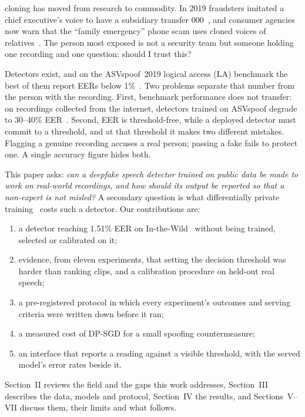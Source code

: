 \documentclass[journal]{IEEEtran}
\begin{document}
 cloning has moved from research to commodity. In 2019
fraudsters imitated a chief executive's voice to have a subsidiary transfer
000~\cite{wsj2019voice}, and consumer agencies now warn that
the ``family emergency'' phone scam uses cloned voices of
relatives~\cite{ftc2023voice}. The person most exposed is not a security
team but someone holding one recording and one question: should I trust
this?

Detectors exist, and on the ASVspoof~2019 logical access (LA) benchmark the
best of them report EERs below 1\%~\cite{jung2022aasist,tak2022ssl}. Two
problems separate that number from the person with the recording. First,
benchmark performance does not transfer: on recordings collected from the
internet, detectors trained on ASVspoof degrade to 30--40\%
EER~\cite{muller2022itw}. Second, EER is threshold-free, while a deployed
detector must commit to a threshold, and at that threshold it makes two
different mistakes. Flagging a genuine recording accuses a real person;
passing a fake fails to protect one. A single accuracy figure hides both.

This paper asks: \emph{can a deepfake speech detector trained on public data
be made to work on real-world recordings, and how should its output be
reported so that a non-expert is not misled?} A secondary question is what
differentially private training~\cite{abadi2016dpsgd} costs such a detector.
Our contributions are:
\begin{enumerate}
\item a detector reaching 1.51\% EER on In-the-Wild~\cite{muller2022itw}
  without being trained, selected or calibrated on it;
\item evidence, from eleven experiments, that setting the decision threshold
  was harder than ranking clips, and a calibration procedure on held-out real
  speech;
\item a pre-registered protocol in which every experiment's outcomes and
  serving criteria were written down before it ran;
\item a measured cost of DP-SGD for a small spoofing countermeasure;
\item an interface that reports a reading against a visible threshold, with
  the served model's error rates beside it.
\end{enumerate}
Section~II reviews the field and the gaps this work addresses, Section~III
describes the data, models and protocol, Section~IV the results, and
Sections~V--VII discuss them, their limits and what follows.
\end{document}
